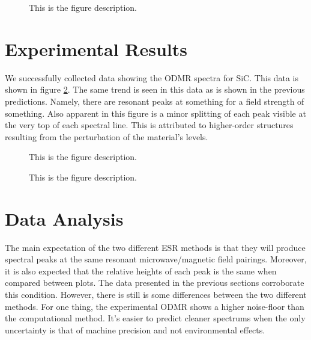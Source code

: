 \documentclass[oneside, astronomy, noacknowlegments]{BYUPhys}
\begin{document}
\begin{figure}
    \caption[ESR computational model for CdTe]{\label{fig:CdTeModel}
     This is the figure description.}
 \end{figure}

\section{Experimental Results}

We successfully collected data showing the ODMR spectra for SiC. This data is shown in figure \ref{fig:SiCResults}. The same trend is seen in this data as is shown in the previous predictions. Namely, there are resonant peaks at something for a field strength of something. Also apparent in this figure is a minor splitting of each peak visible at the very top of each spectral line. This is attributed to higher-order structures resulting from the perturbation of the material's levels.

\begin{figure}
    \caption[Experimental ODMR for SiC]{\label{fig:SiCResults}
     This is the figure description.}
 \end{figure}

\begin{figure}
    \caption[Experimental ODMR for CdTe]{\label{fig:CdTeResults}
     This is the figure description.}
 \end{figure}


\section{Data Analysis}

The main expectation of the two different ESR methods is that they will produce spectral peaks at the same resonant microwave/magnetic field pairings. Moreover, it is also expected that the relative heights of each peak is the same when compared between plots. The data presented in the previous sections corroborate this condition. However, there is still is some differences between the two different methods. For one thing, the experimental ODMR shows a higher noise-floor than the computational method. It's easier to predict cleaner spectrums when the only uncertainty is that of machine precision and not environmental effects.
\end{document}
